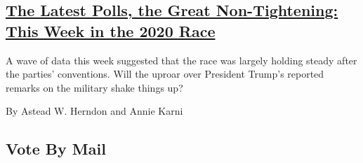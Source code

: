 \begin{enumerate}
  \hypertarget{the-latest-polls-the-great-non-tightening-this-week-in-the-2020-race}{%
  \subsection{\texorpdfstring{\href{/2020/09/05/us/politics/trump-biden-polls-election.html}{The
  Latest Polls, the Great Non-Tightening: This Week in the 2020
  Race}}{The Latest Polls, the Great Non-Tightening: This Week in the 2020 Race}}\label{the-latest-polls-the-great-non-tightening-this-week-in-the-2020-race}}

  A wave of data this week suggested that the race was largely holding
  steady after the parties' conventions. Will the uproar over President
  Trump's reported remarks on the military shake things up?

  By Astead W. Herndon and Annie Karni
\end{enumerate}

\hypertarget{vote-by-mail}{%
\subsection{Vote By Mail}\label{vote-by-mail}}

